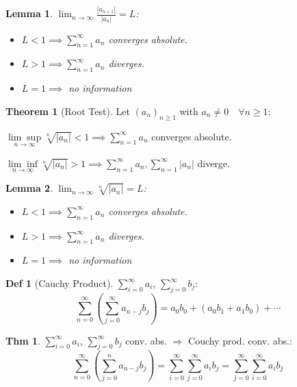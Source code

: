 \documentclass[a4paper, 10pt]{article}
\newtheorem*{lemma}{Lemma}
\theoremstyle{definition}
\newtheorem*{theorem}{Thm}
\newtheorem*{definition}{Def}
\theoremstyle{named}
\newtheorem*{ntheorem_wrapper}{Theorem}
\newenvironment{ntheorem}%
    {\begin{mdframed}[style=important]\begin{ntheorem_wrapper}}%
    {\end{ntheorem_wrapper}\end{mdframed}}
\begin{document}
\begin{lemma}
    $\lim_{n\to\infty} \frac{|a_{n+1}|}{|a_n|} = L$:

    \begin{itemize}
        \item $L < 1 \implies \sum_{n=1}^\infty a_n$ converges absolute.
        \item $L > 1 \implies \sum_{n=1}^\infty a_n$ diverges.
        \item $L = 1 \implies$ no information
    \end{itemize}
\end{lemma}

\begin{ntheorem}[Root Test]
    Let $(a_n)_{n \geq 1}$ with $a_n \neq 0 \quad \forall n\geq 1$:

    $\underset{n\to\infty}{\lim\sup} \sqrt[n]{|a_n|} < 1 \implies \sum_{n=1}^\infty a_n$ converges absolute.

    $\underset{n\to\infty}{\lim\inf} \sqrt[n]{|a_n|} > 1 \implies \sum_{n=1}^\infty a_n, \sum_{n=1}^\infty |a_n|$ diverge.
\end{ntheorem}

\begin{lemma}
    $\lim_{n\to\infty} \sqrt[n]{|a_n|} = L$:

    \begin{itemize}
        \item $L < 1 \implies \sum_{n=1}^\infty a_n$ converges absolute.
        \item $L > 1 \implies \sum_{n=1}^\infty a_n$ diverges.
        \item $L = 1 \implies$ no information
    \end{itemize}
\end{lemma}

\begin{definition}[Cauchy Product]
    $\sum_{i=0}^\infty a_i$, $\sum_{j=0}^\infty b_j$:
    $$\sum_{n=0}^\infty (\sum_{j=0}^\infty a_{n-j}b_j) = a_0b_0 + (a_0b_1 + a_1b_0) + \cdots$$
\end{definition}

\begin{theorem}
    $\sum\limits_{i=0}^\infty a_i$, $\sum\limits_{j=0}^\infty b_j$ conv. abs. $\Rightarrow$ Couchy prod. conv. abs.:
    $$\sum_{n=0}^\infty (\sum_{j=0}^n a_{n-j}b_j) = \sum_{i=0}^\infty \sum_{j=0}^\infty a_i b_j = \sum_{j=0}^\infty \sum_{i=0}^\infty a_i b_j$$
\end{theorem}
\end{document}
